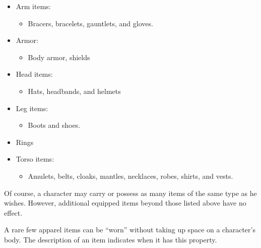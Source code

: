 \begin{itemize}
    \item Arm items:
        \begin{itemize}
            \item Bracers, bracelets, gauntlets, and gloves.
        \end{itemize}
    \item Armor:
        \begin{itemize}
            \item Body armor, shields
        \end{itemize}
    \item Head items:
        \begin{itemize}
            \item Hats, headbands, and helmets
        \end{itemize}
    \item Leg items:
        \begin{itemize}
            \item Boots and shoes.
        \end{itemize}
    \item Rings
    \item Torso items:
        \begin{itemize}
            \item Amulets, belts, cloaks, mantles, necklaces, robes, shirts, and vests.
        \end{itemize}
\end{itemize}

Of course, a character may carry or possess as many items of the same type as he wishes.
However, additional equipped items beyond those listed above have no effect.

A rare few apparel items can be ``worn'' without taking up space on a character's body.
The description of an item indicates when it has this property.

